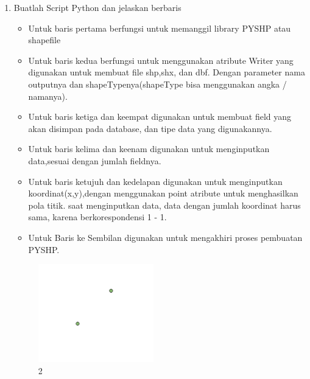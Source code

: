 \begin{enumerate}
	\item Buatlah Script Python dan jelaskan berbaris
	
	\begin{itemize}
		\item Untuk baris pertama berfungsi untuk memanggil library PYSHP atau shapefile
		\item Untuk baris kedua berfungsi untuk menggunakan atribute Writer yang digunakan untuk membuat file shp,shx, dan dbf. \hfill\break Dengan parameter nama outputnya dan shapeTypenya(shapeType bisa menggunakan angka / namanya).
		\item Untuk baris ketiga dan keempat digunakan untuk membuat field yang akan disimpan pada database, dan tipe data yang digunakannya.
		\item Untuk baris kelima dan keenam digunakan untuk menginputkan data,sesuai dengan jumlah fieldnya.
		\item Untuk baris ketujuh dan kedelapan digunakan untuk menginputkan koordinat(x,y),dengan menggunakan point atribute untuk menghasilkan pola titik. \hfill\break
		saat menginputkan data, data dengan jumlah koordinat harus sama, karena berkorespondensi 1 - 1.
		\item Untuk Baris ke Sembilan digunakan untuk mengakhiri proses pembuatan PYSHP.
	\end{itemize}
	\hfill\break
	\begin{figure}[H]
		\includegraphics[width=5cm]{figures/1174009/2/2.png}
		\centering
		\caption{2}
	\end{figure}


\end{enumerate}
